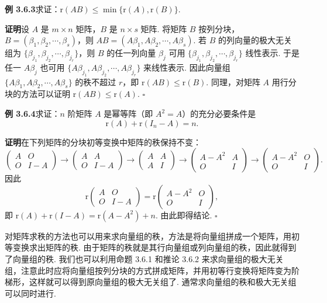 \documentclass[UTF8, 12pt, fontset=fandol, oneside]{ctexart}
\begin{document}
\noindent\textbf{例 3.6.3}\quad 求证：$\mathrm{r}(AB)\leq \min\{\mathrm{r}(A),\mathrm{r}(B)\}$.

\noindent\textbf{证明}\quad 设 $A$ 是 $m\times n$ 矩阵，$B$ 是 $n\times s$ 矩阵. 将矩阵 $B$ 按列分块，$B=(\beta_1,\beta_2,\cdots,\beta_s)$，则 $AB=(A\beta_1,A\beta_2,\cdots,A\beta_s)$. 若 $B$ 的列向量的极大无关组为 $\{\beta_{j_1},\beta_{j_2},\cdots,\beta_{j_r}\}$，则 $B$ 的任一列向量 $\beta_j$ 可用 $\{\beta_{j_1},\beta_{j_2},\cdots,\beta_{j_r}\}$ 线性表示. 于是任一 $A\beta_j$ 也可用 $\{A\beta_{j_1},A\beta_{j_2},\cdots,A\beta_{j_r}\}$ 来线性表示. 因此向量组 $\{A\beta_1,A\beta_2,\cdots,A\beta_s\}$ 的秩不超过 $r$，即 $\mathrm{r}(AB)\leq \mathrm{r}(B)$. 同理，对矩阵 $A$ 用行分块的方法可以证明 $\mathrm{r}(AB)\leq \mathrm{r}(A)$. $\square$

\noindent\textbf{例 3.6.4}\quad 求证：$n$ 阶矩阵 $A$ 是幂等阵（即 $A^2=A$）的充分必要条件是
\[
\mathrm{r}(A)+\mathrm{r}(I_n-A)=n.
\]

\noindent\textbf{证明}\quad 在下列矩阵的分块初等变换中矩阵的秩保持不变：
\[
\left(\begin{array}{cc}
A&O\\
O&I-A
\end{array}\right)
\to
\left(\begin{array}{cc}
A&A\\
O&I-A
\end{array}\right)
\to
\left(\begin{array}{cc}
A&A\\
A&I
\end{array}\right)
\to
\left(\begin{array}{cc}
A-A^2&A\\
O&I
\end{array}\right)
\to
\left(\begin{array}{cc}
A-A^2&O\\
O&I
\end{array}\right).
\]
因此
\[
\mathrm{r}\left(\begin{array}{cc}
A&O\\
O&I-A
\end{array}\right)
=
\mathrm{r}\left(\begin{array}{cc}
A-A^2&O\\
O&I
\end{array}\right),
\]
即 $\mathrm{r}(A)+\mathrm{r}(I-A)=\mathrm{r}(A-A^2)+n$. 由此即得结论. $\square$

对矩阵求秩的方法也可以用来求向量组的秩，方法是将向量组拼成一个矩阵，用初等变换求出矩阵的秩. 由于矩阵的秩就是其行向量组或列向量组的秩，因此就得到了向量组的秩. 我们也可以利用命题 3.6.1 和推论 3.6.2 来求向量组的极大无关组，注意此时应将向量组按列分块的方式拼成矩阵，并用初等行变换将矩阵变为阶梯形，这样就可以得到原向量组的极大无关组了. 通常求向量组的秩和极大无关组可以同时进行.
\end{document}
